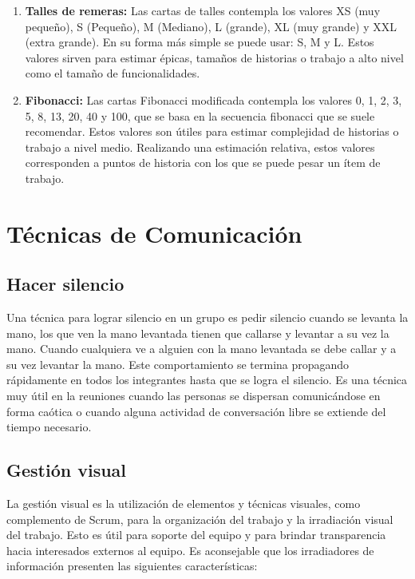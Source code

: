 \begin{enumerate}

\item \textbf{Talles de remeras:} Las cartas de talles contempla los valores XS (muy pequeño), S (Pequeño), M (Mediano), L (grande), XL (muy grande) y XXL (extra grande). En su forma más simple se puede usar: S, M y L. Estos valores sirven para estimar épicas, tamaños de historias o trabajo a alto nivel como el tamaño de funcionalidades. 

\item \textbf{Fibonacci:} Las cartas Fibonacci modificada contempla los valores 0, 1, 2, 3, 5, 8, 13, 20, 40 y 100, que se basa en la secuencia fibonacci que se suele recomendar. Estos valores son útiles para estimar complejidad de historias o trabajo a nivel medio. Realizando una estimación relativa, estos valores corresponden a puntos de historia con los que se puede pesar un ítem de trabajo.

\end{enumerate}

\newpage
\section{Técnicas de Comunicación}

\subsection{Hacer silencio}

Una técnica para lograr silencio en un grupo es pedir silencio cuando se levanta la mano, los que ven la mano levantada tienen que callarse y levantar a su vez la mano. Cuando cualquiera ve a alguien con la mano levantada se debe callar y a su vez levantar la mano. Este comportamiento se termina propagando rápidamente en todos los integrantes hasta que se logra el silencio. Es una técnica muy útil en la reuniones cuando las personas se dispersan comunicándose en forma caótica o cuando alguna actividad de conversación libre se extiende del tiempo necesario.


\subsection{Gestión visual}

La gestión visual es la utilización de elementos y técnicas visuales, como complemento de Scrum, para la organización del trabajo y la irradiación visual del trabajo. Esto es útil para soporte del equipo y para brindar transparencia hacia interesados externos al equipo.
Es aconsejable que los irradiadores de información presenten las siguientes características:

